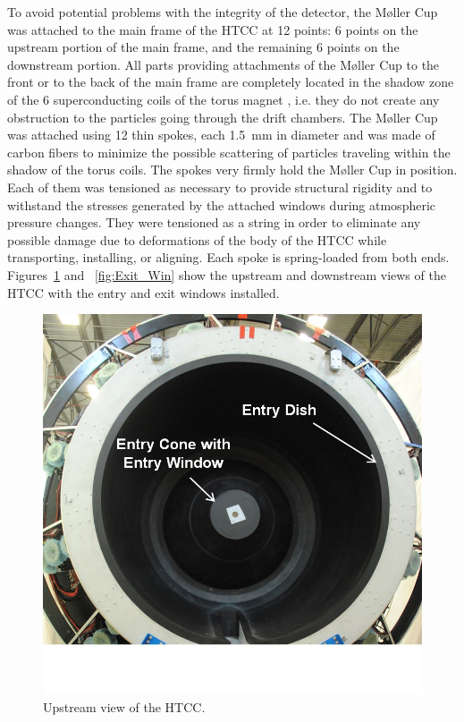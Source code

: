 To avoid potential problems with the integrity of the detector, the M{\o}ller Cup was attached to the main frame
of the HTCC at 12 points: 6 points on the upstream portion of the main frame, and the remaining 6 points on the
downstream portion. All parts providing attachments of the M{\o}ller Cup to the front or to the back of the main
frame are completely located in the shadow zone of the 6 superconducting coils of the torus magnet
\cite{magnets-nim}, i.e. they do not create any obstruction to the particles going through the drift chambers.
The M{\o}ller Cup was attached using 12 thin spokes, each 1.5~mm in diameter and was made of carbon fibers to
minimize the possible scattering of particles traveling within the shadow of the torus coils. The spokes very
firmly hold the M{\o}ller Cup in position. Each of them was tensioned as necessary to provide structural rigidity
and to withstand the stresses generated by the attached windows during atmospheric pressure changes. They
were tensioned as a string in order to eliminate any possible damage due to deformations of the body of the
HTCC while transporting, installing, or aligning. Each spoke is spring-loaded from both ends.
Figures~\ref{fig:Front_View} and ~\ref{fig:Exit_Win} show the upstream and downstream views of the HTCC
with the entry and exit windows installed.

\begin{figure}[ht]
    \centering
    \includegraphics[width=1.0\linewidth,trim={0 2.5cm 0 0},clip]{images/Front_View}
    \caption{Upstream view of the HTCC.}
    \label{fig:Front_View}
\end{figure}

